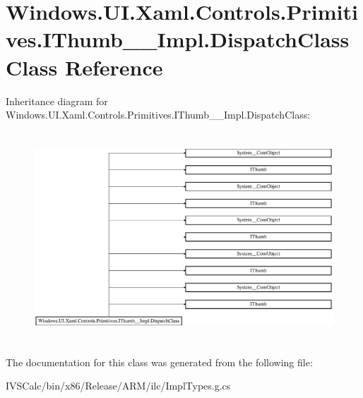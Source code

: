 \hypertarget{class_windows_1_1_u_i_1_1_xaml_1_1_controls_1_1_primitives_1_1_i_thumb_____impl_1_1_dispatch_class}{}\section{Windows.\+U\+I.\+Xaml.\+Controls.\+Primitives.\+I\+Thumb\+\_\+\+\_\+\+Impl.\+Dispatch\+Class Class Reference}
\label{class_windows_1_1_u_i_1_1_xaml_1_1_controls_1_1_primitives_1_1_i_thumb_____impl_1_1_dispatch_class}
Inheritance diagram for Windows.\+U\+I.\+Xaml.\+Controls.\+Primitives.\+I\+Thumb\+\_\+\+\_\+\+Impl.\+Dispatch\+Class\+:\begin{figure}[H]
\begin{center}
\leavevmode
\includegraphics[height=7.897436cm]{class_windows_1_1_u_i_1_1_xaml_1_1_controls_1_1_primitives_1_1_i_thumb_____impl_1_1_dispatch_class}
\end{center}
\end{figure}


The documentation for this class was generated from the following file\+:\begin{DoxyCompactItemize}
\item 
I\+V\+S\+Calc/bin/x86/\+Release/\+A\+R\+M/ilc/Impl\+Types.\+g.\+cs\end{DoxyCompactItemize}
